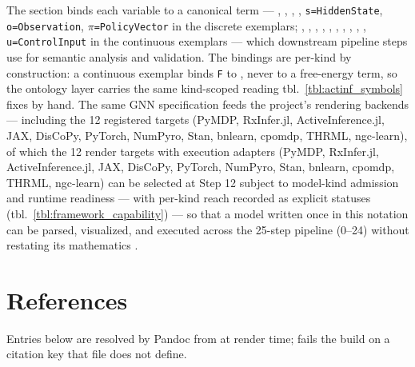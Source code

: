 \documentclass[
  english,
  9pt,
]{extarticle}
\begin{document}
The  section binds each variable
to a canonical term --- ,
, ,
, \texttt{s=HiddenState},
\texttt{o=Observation}, \texttt{\texorpdfstring{\ensuremath{\pi}}{pi}=PolicyVector} in the discrete
exemplars; ,
, ,
, ,
, ,
, ,
, \texttt{u=ControlInput} in the
continuous exemplars --- which downstream pipeline steps use for
semantic analysis and validation. The bindings are per-kind by
construction: a continuous exemplar binds \texttt{F} to
, never to a free-energy term, so the
ontology layer carries the same kind-scoped reading
tbl.~\ref{tbl:actinf_symbols} fixes by hand. The same GNN specification
feeds the project's rendering backends --- including the 12 registered
targets (PyMDP, RxInfer.jl, ActiveInference.jl, JAX, DisCoPy, PyTorch,
NumPyro, Stan, bnlearn, cpomdp, THRML, ngc-learn), of which the 12
render targets with execution adapters (PyMDP, RxInfer.jl,
ActiveInference.jl, JAX, DisCoPy, PyTorch, NumPyro, Stan, bnlearn,
cpomdp, THRML, ngc-learn) can be selected at Step 12 subject to
model-kind admission and runtime readiness --- with per-kind reach
recorded as explicit statuses (tbl.~\ref{tbl:framework_capability}) ---
so that a model written once in this notation can be parsed, visualized,
and executed across the 25-step pipeline (0--24) without restating its
mathematics \citep{gnn2023, heins2022, defelice2021}.

\newpage

\section{References}\label{sec:references}

Entries below are resolved by Pandoc from
\href{https://github.com/ActiveInferenceInstitute/Generalized_Notation_Notation/blob/main/manuscript/references.bib}{}
at render time;  fails the
build on a citation key that file does not define.



\providecommand{\bibsection}{}
\renewcommand{\bibsection}{}


\end{document}
